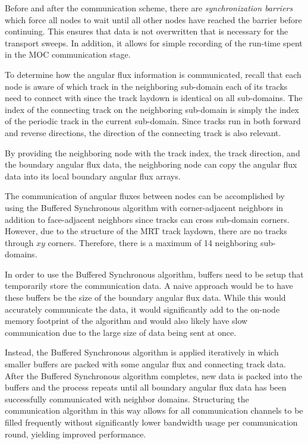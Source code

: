 Before and after the communication scheme, there are \textit{synchronization barriers} which force all nodes to wait until all other nodes have reached the barrier before continuing. This ensures that data is not overwritten that is necessary for the transport sweeps. In addition, it allows for simple recording of the run-time spent in the \ac{MOC} communication stage.

To determine how the angular flux information is communicated, recall that each node is aware of which track in the neighboring sub-domain each of its tracks need to connect with since the track laydown is identical on all sub-domains. The index of the connecting track on the neighboring sub-domain is simply the index of the periodic track in the current sub-domain. Since tracks run in both forward and reverse directions, the direction of the connecting track is also relevant.

By providing the neighboring node with the track index, the track direction, and the boundary angular flux data, the neighboring node can copy the angular flux data into its local boundary angular flux arrays. 

The communication of angular fluxes between nodes can be accomplished by using the Buffered Synchronous algorithm with corner-adjacent neighbors in addition to face-adjacent neighbors since tracks can cross sub-domain corners. However, due to the structure of the \ac{MRT} track laydown, there are no tracks through $xy$ corners. Therefore, there is a maximum of 14 neighboring sub-domains. 

In order to use the Buffered Synchronous algorithm, buffers need to be setup that temporarily store the communication data. A naive approach would be to have these buffers be the size of the boundary angular flux data. While this would accurately communicate the data, it would significantly add to the on-node memory footprint of the algorithm and would also likely have slow communication due to the large size of data being sent at once.

Instead, the Buffered Synchronous algorithm is applied iteratively in which smaller buffers are packed with some angular flux and connecting track data. After the Buffered Synchronous algorithm completes, new data is packed into the buffers and the process repeats until all boundary angular flux data has been successfully communicated with neighbor domains. Structuring the communication algorithm in this way allows for all communication channels to be filled frequently without significantly lower bandwidth usage per communication round, yielding improved performance. 

